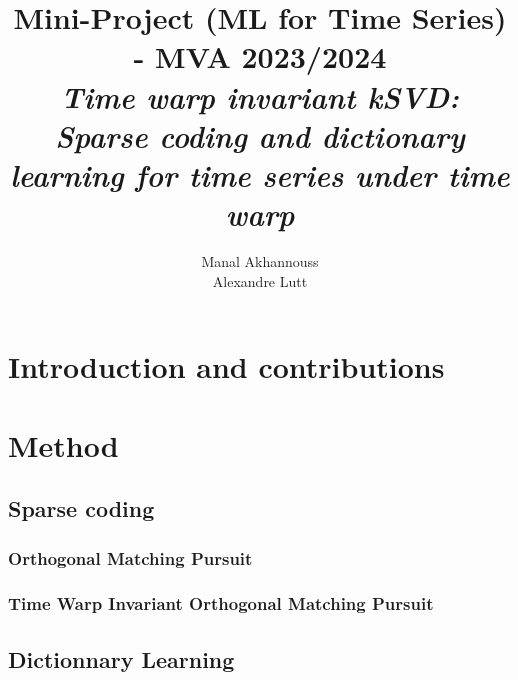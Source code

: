 \documentclass[11pt]{article}
\title{Mini-Project (ML for Time Series) - MVA 2023/2024 \\ \Large{\textit{Time warp invariant kSVD:\\ Sparse coding and dictionary learning for time series under time warp}}}
\author{
Manal Akhannouss \email{manal.akhannouss@eleves.enpc.fr} \\
Alexandre Lutt \email{alexandre.lutt@eleves.enpc.fr}
}
\begin{document}
\maketitle

\section{Introduction and contributions}

\cite{main_paper}

\section{Method}

\paragraph{} 

\subsection{Sparse coding}

\paragraph{} 

\subsubsection{Orthogonal Matching Pursuit}

\paragraph{} 

\subsubsection{Time Warp Invariant Orthogonal Matching Pursuit}

\paragraph{} 

\subsection{Dictionnary Learning}

\paragraph{} 
\end{document}
